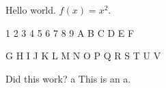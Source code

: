 \documentclass[a4paper]{article}
\begin{document}
Hello world. $f(x)=x^2$.


{ 1 2 3 4 5 6 7 8 9 A B C D E F}


{\foo G H I J K L M N O P Q R S T U V}


Did this work?
{\foo a}
This is an a.
\end{document}

